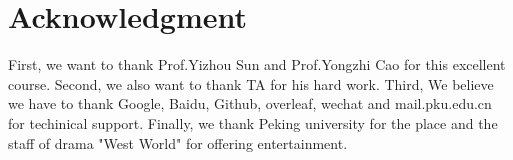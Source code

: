 \documentclass{sig-alternate}
\begin{document}
\section{Acknowledgment}
First, we want to thank Prof.Yizhou Sun and Prof.Yongzhi Cao for this excellent course. Second, we also want to thank TA for his hard work. Third, We believe we have to thank Google, Baidu, Github, overleaf, wechat and mail.pku.edu.cn for techinical support. Finally, we thank Peking university for the place and the staff of drama "West World" for offering entertainment.
%

%
%

\end{document}
